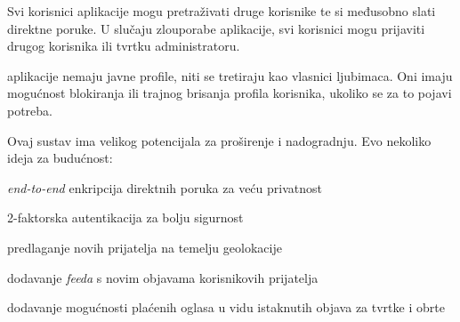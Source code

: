 		\par Svi korisnici aplikacije mogu pretraživati druge korisnike te si međusobno slati direktne poruke. U slučaju zlouporabe aplikacije, svi korisnici mogu prijaviti drugog korisnika ili tvrtku administratoru.
		
		\par {} aplikacije nemaju javne profile, niti se tretiraju kao vlasnici ljubimaca. Oni imaju mogućnost blokiranja ili trajnog brisanja profila korisnika, ukoliko se za to pojavi potreba.
		
		\par Ovaj sustav ima velikog potencijala za proširenje i nadogradnju. Evo nekoliko ideja za budućnost:
		\begin{packed_item}
			\item \textit {end-to-end} enkripcija direktnih poruka za veću privatnost
			\item 2-faktorska autentikacija za bolju sigurnost
			\item predlaganje novih prijatelja na temelju geolokacije
			\item dodavanje \textit {feeda} s novim objavama korisnikovih prijatelja
			\item dodavanje mogućnosti plaćenih oglasa u vidu istaknutih objava za tvrtke i obrte
		\end{packed_item}
		
		
		\eject
		
		
	